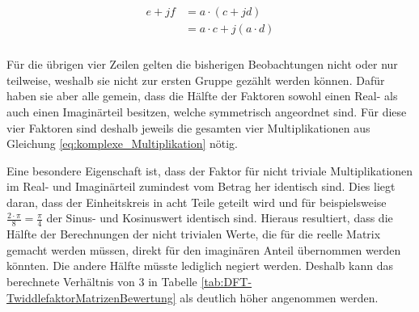  \begin{align}\label{eq:halb_komplexe_Multiplikation}
 \begin{split}
  e + jf &= a \cdot (c + jd)\\
         &= a \cdot c + j(a \cdot d)\\
 \end{split}
 \end{align}
 
 Für die übrigen vier Zeilen gelten die bisherigen Beobachtungen nicht oder nur teilweise, weshalb sie nicht zur ersten Gruppe gezählt werden können.
 Dafür haben sie aber alle gemein, dass die Hälfte der Faktoren sowohl einen Real- als auch einen Imaginärteil besitzen, welche symmetrisch angeordnet sind.
 Für diese vier Faktoren sind deshalb jeweils die gesamten vier Multiplikationen aus Gleichung \ref{eq:komplexe_Multiplikation} nötig.

 Eine besondere Eigenschaft ist, dass der Faktor für nicht triviale Multiplikationen im Real- und Imaginärteil zumindest vom Betrag her identisch sind.
 Dies liegt daran, dass der Einheitskreis in acht Teile geteilt wird und für beispielsweise $\frac{2\cdot\pi}{8}=\frac{\pi}{4}$ der Sinus- und Kosinuswert identisch sind. 
 Hieraus resultiert, dass die Hälfte der Berechnungen der nicht trivialen Werte, die für die reelle Matrix gemacht werden müssen,
 direkt für den imaginären Anteil übernommen werden könnten. Die andere Hälfte müsste lediglich negiert werden. 
 Deshalb kann das berechnete Verhältnis von 3 in Tabelle \ref{tab:DFT-TwiddlefaktorMatrizenBewertung} als deutlich höher angenommen werden.
 


